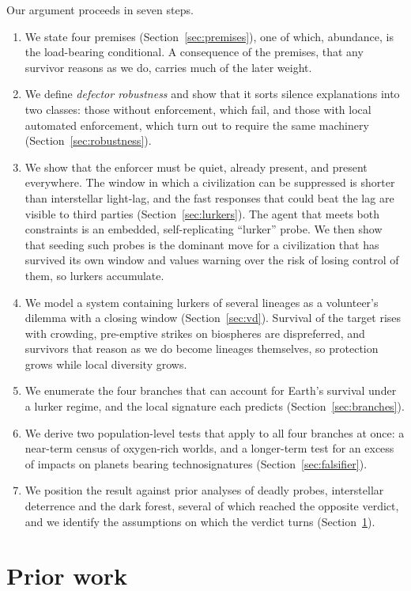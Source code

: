 \documentclass[preprint,12pt]{elsarticle}
\theoremstyle{definition}
\begin{document}
Our argument proceeds in seven steps.
\begin{enumerate}
  \item We state four premises (Section~\ref{sec:premises}), one of which, abundance, is the load-bearing conditional. A consequence of the premises, that any survivor reasons as we do, carries much of the later weight.
  \item We define \emph{defector robustness} and show that it sorts silence explanations into two classes: those without enforcement, which fail, and those with local automated enforcement, which turn out to require the same machinery (Section~\ref{sec:robustness}).
  \item We show that the enforcer must be quiet, already present, and present everywhere. The window in which a civilization can be suppressed is shorter than interstellar light-lag, and the fast responses that could beat the lag are visible to third parties (Section~\ref{sec:lurkers}). The agent that meets both constraints is an embedded, self-replicating ``lurker'' probe. We then show that seeding such probes is the dominant move for a civilization that has survived its own window and values warning over the risk of losing control of them, so lurkers accumulate.
  \item We model a system containing lurkers of several lineages as a volunteer's dilemma with a closing window (Section~\ref{sec:vd}). Survival of the target rises with crowding, pre-emptive strikes on biospheres are dispreferred, and survivors that reason as we do become lineages themselves, so protection grows while local diversity grows.
  \item We enumerate the four branches that can account for Earth's survival under a lurker regime, and the local signature each predicts (Section~\ref{sec:branches}).
  \item We derive two population-level tests that apply to all four branches at once: a near-term census of oxygen-rich worlds, and a longer-term test for an excess of impacts on planets bearing technosignatures (Section~\ref{sec:falsifier}).
  \item We position the result against prior analyses of deadly probes, interstellar deterrence and the dark forest, several of which reached the opposite verdict, and we identify the assumptions on which the verdict turns (Section~\ref{sec:prior}).
\end{enumerate}

\section{Prior work}
\label{sec:prior}
\end{document}
